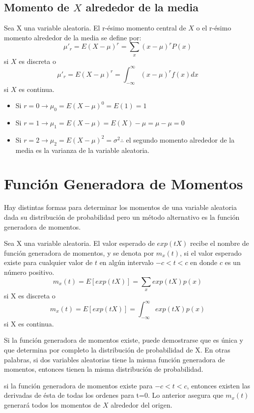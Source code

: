 \documentclass{book}
\begin{document}
\subsection{Momento de $X$ alrededor de la media} 

Sea X una variable aleatoria. El r-ésimo momento central de $X$ o el r-ésimo momento alrededor de la media se define por:
$$\mu'_r = E(X - \mu)^r=\underset{x}{\sum}(x-\mu)^rP(x)$$ si $X$ es discreta o $$\mu'_r=E(X-\mu)^r=\int_{-\infty}^{\infty}(x-\mu)^rf(x) dx$$ si $X$ es continua.

\begin{itemize}
    \item Si $r=0 \rightarrow \mu_0= E(X-\mu)^0=E(1) = 1$
    \item Si $r=1 \rightarrow \mu_1= E(X-\mu) = E(X)-\mu = \mu - \mu =0$
    \item Si $r=2 \rightarrow \mu_2= E(X-\mu)^2 = \sigma^2 \therefore $ el segundo momento alrededor de la media es la varianza de la variable aleatoria.
\end{itemize}



\section{Función Generadora de Momentos}
Hay distintas formas para determinar los momentos de una variable aleatoria dada su distribución de probabilidad pero un método alternativo es la función generadora de momentos.

Sea X una variable aleatoria. El valor esperado de $exp(tX)$ recibe el nombre de función generadora de momentos, y se denota por $m_x(t)$, si el valor esperado existe para cualquier valor de $t$ en algún intervalo $-c < t <c$ en donde $c$ es un número positivo. 
$$m_x(t)=E[exp(tX)]=\underset{x}{\sum}exp(tX)p(x)$$  si X es discreta o $$m_x(t)=E[exp(tX)]=\int_{-\infty}^\infty exp(tX)p(x)$$ si X es continua.

Si la función generadora de momentos existe, puede demostrarse que es única y que determina por completo la distribución de probabilidad de X. En otras palabras, si dos variables aleatorias tiene la misma función generadora de momentos, entonces tienen la misma distribución de probabilidad. 

si la función generadora de momentos existe para $-c < t < c$, entonces existen las derivadas de ésta de todas los ordenes para t=0. Lo anterior asegura que $m_x(t)$ generará todos los momentos de $X$ alrededor del origen. 
\end{document}
